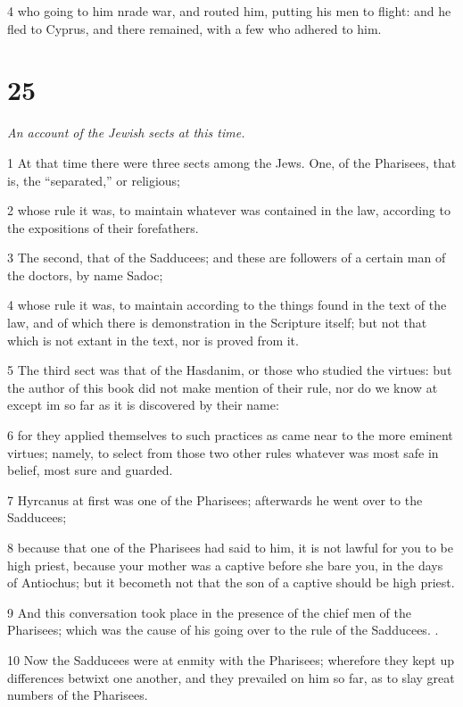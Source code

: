 4 who going to him nrade war, and routed him, putting his men to flight: and he fled to Cyprus, and there remained, with a few who adhered to him. 

\chapter{25}

\par \textit{An account of the Jewish sects at this time.}

1 At that time there were three sects among the Jews. One, of the Pharisees, that is, the “separated,” or religious; 

2 whose rule it was, to maintain whatever was contained in the law, according to the expositions of their forefathers. 

3 The second, that of the Sadducees; and these are followers of a certain man of the doctors, by name Sadoc; 

4 whose rule it was, to maintain according to the things found in the text of the law, and of which there is demonstration in the Scripture itself; but not that which is not extant in the text, nor is proved from it. 

5 The third sect was that of the Hasdanim, or those who studied the virtues: but the author of this book did not make mention of their rule, nor do we know at except im so far as it is discovered by their name: 

6 for they applied themselves to such practices as came near to the more eminent virtues; namely, to select from those two other rules whatever was most safe in belief, most sure and guarded. 

7 Hyrcanus at first was one of the Pharisees; afterwards he went over to the Sadducees; 

8 because that one of the Pharisees had said to him, it is not lawful for you to be high priest, because your mother was a captive before she bare you, in the days of Antiochus; but it becometh not that the son of a captive should be high priest.

9 And this conversation took place in the presence of the chief men of the Pharisees; which was the cause of his going over to the rule of the Sadducees. .

10 Now the Sadducees were at enmity with the Pharisees; wherefore they kept up differences betwixt one another, and they prevailed on him so far, as to slay great numbers of the Pharisees. 

